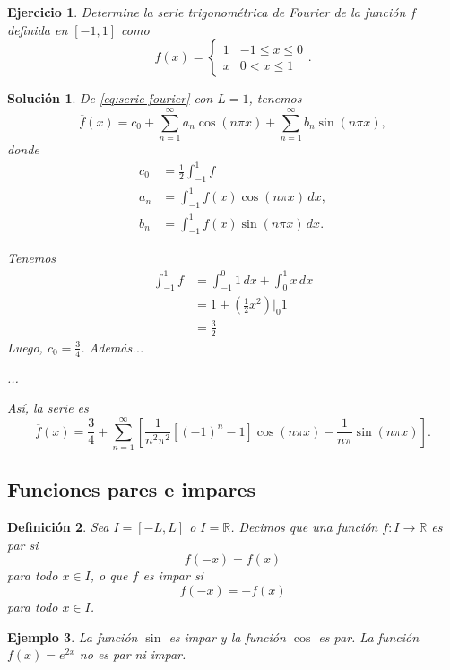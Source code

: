 \documentclass[11pt,letterpaper]{report}
\newtheorem{defn}{Definición}[chapter]
\newtheorem{example}[defn]{Ejemplo}
\newtheorem{exe}[defn]{Ejercicio}
\newtheorem*{sol}{Solución}
\newcommand\R{\mathbb R}
\newcommand\<{\langle}
\renewcommand\>{\rangle}
\begin{document}
\begin{exe}\label{ejemplo-fourier}
  Determine la serie trigonométrica de Fourier de la función $f$
  definida en $[-1,1]$ como
  \[
    f(x) =
    \begin{cases}
      1 & -1\leq x\leq 0 \\
      x & 0<x\leq 1
    \end{cases}
  .\]
\end{exe}
\begin{sol}
  De \eqref{eq:serie-fourier} con $L=1$, tenemos
  \[
    \overline{f}(x) = c_0
    + \sum_{n=1}^\infty a_n\cos(n\pi x)
    + \sum_{n=1}^\infty b_n\sin(n\pi x)
  ,\]
  donde
  \begin{align*}
    c_0 &= \frac{1}{2}\int_{-1}^1 f \\
    a_n &= \int_{-1}^1 f(x)\cos(n\pi x)\,dx, \\
    b_n &= \int_{-1}^1 f(x)\sin(n\pi x)\,dx.
  \end{align*}

  Tenemos
  \begin{align*}
    \int_{-1}^{1}f
    &= \int_{-1}^{0}1\,dx + \int_{0}^{1}x\,dx \\
    &= 1 + \left( \frac{1}{2}x^{2} \right)\Big|_{0}{1} \\
    &= \frac{3}{2}
  \end{align*}
  Luego, $c_0=\frac{3}{4}$.
  Además...

  ...

  Así, la serie es
  \[
    \overline{f}(x)
    =
    \frac{3}{4}
    +
    \sum_{n=1}^{\infty}
    \left[
      \frac{1}{n^{2}\pi^{2}}[(-1)^{n}-1]\cos(n\pi x)
      -\frac{1}{n\pi}\sin(n\pi x)
    \right]
  .\]
    
\end{sol}

\subsection{Funciones pares e impares}

\begin{defn}
  Sea $I=[-L,L]$ o $I=\R$.
  Decimos que una función $f:I\to\R$ es par si
  \[
    f(-x) = f(x)
  \]
  para todo $x\in I$, o que $f$ es impar si
  \[
    f(-x) = -f(x)
  \]
  para todo $x\in I$.
\end{defn}

\begin{example}
  La función $\sin$ es impar y la función $\cos$ es par.
  La función $f(x)=e^{2x}$ no es par ni impar.
\end{example}
\end{document}
